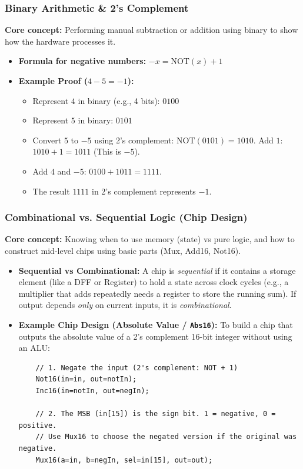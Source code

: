\documentclass[12pt,a4paper]{article}
\begin{document}
\subsubsection*{Binary Arithmetic \& 2's Complement}
\textbf{Core concept:} Performing manual subtraction or addition using binary to show how the hardware processes it.
\begin{itemize}
    \item \textbf{Formula for negative numbers:} $-x = \text{NOT}(x) + 1$
    \item \textbf{Example Proof ($4 - 5 = -1$):}
    \begin{itemize}
        \item Represent $4$ in binary (e.g., 4 bits): $0100$
        \item Represent $5$ in binary: $0101$
        \item Convert $5$ to $-5$ using 2's complement: $\text{NOT}(0101) = 1010$. Add $1$: $1010 + 1 = 1011$ (This is $-5$).
        \item Add $4$ and $-5$: $0100 + 1011 = 1111$.
        \item The result $1111$ in 2's complement represents $-1$.
    \end{itemize}
\end{itemize}

\subsubsection*{Combinational vs. Sequential Logic (Chip Design)}
\textbf{Core concept:} Knowing when to use memory (state) vs pure logic, and how to construct mid-level chips using basic parts (Mux, Add16, Not16).
\begin{itemize}
    \item \textbf{Sequential vs Combinational:} A chip is \textit{sequential} if it contains a storage element (like a DFF or Register) to hold a state across clock cycles (e.g., a multiplier that adds repeatedly needs a register to store the running sum). If output depends \textit{only} on current inputs, it is \textit{combinational}.
    \item \textbf{Example Chip Design (Absolute Value / \texttt{Abs16}):} 
    To build a chip that outputs the absolute value of a 2's complement 16-bit integer without using an ALU:
    \begin{verbatim}
    // 1. Negate the input (2's complement: NOT + 1)
    Not16(in=in, out=notIn);
    Inc16(in=notIn, out=negIn);
    
    // 2. The MSB (in[15]) is the sign bit. 1 = negative, 0 = positive.
    // Use Mux16 to choose the negated version if the original was negative.
    Mux16(a=in, b=negIn, sel=in[15], out=out);
    \end{verbatim}
\end{itemize}
\end{document}
